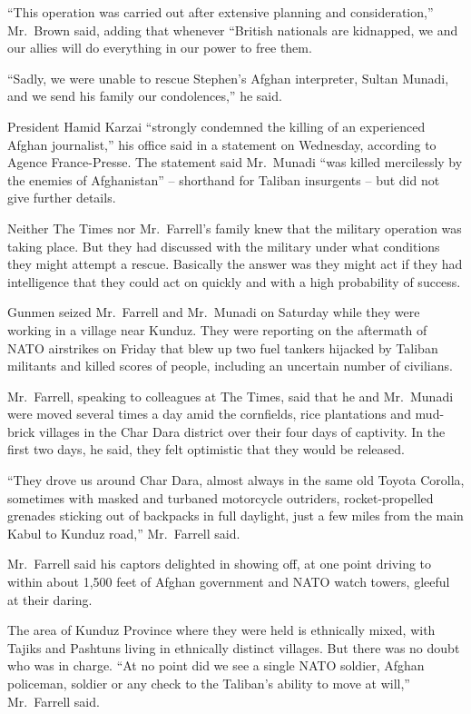 ﻿\documentclass[12pt]{article}
\begin{document}
``This operation was carried out after extensive planning and consideration,'' Mr.~Brown said,
adding that whenever ``British nationals are kidnapped, we and our allies will do everything in our
power to free them.

``Sadly, we were unable to rescue Stephen's Afghan interpreter, Sultan Munadi, and we send his
family our condolences,'' he said.

President Hamid Karzai ``strongly condemned the killing of an experienced Afghan journalist,'' his
office said in a statement on Wednesday, according to Agence France-Presse. The statement said
Mr.~Munadi ``was killed mercilessly by the enemies of Afghanistan'' -- shorthand for Taliban
insurgents -- but did not give further details.

Neither The Times nor Mr.~Farrell's family knew that the military operation was taking place. But
they had discussed with the military under what conditions they might attempt a rescue. Basically
the answer was they might act if they had intelligence that they could act on quickly and with a
high probability of success.

Gunmen seized Mr.~Farrell and Mr.~Munadi on Saturday while they were working in a village near
Kunduz. They were reporting on the aftermath of NATO airstrikes on Friday that blew up two fuel
tankers hijacked by Taliban militants and killed scores of people, including an uncertain number of
civilians.

Mr.~Farrell, speaking to colleagues at The Times, said that he and Mr.~Munadi were moved several
times a day amid the cornfields, rice plantations and mud-brick villages in the Char Dara district
over their four days of captivity. In the first two days, he said, they felt optimistic that they
would be released.

``They drove us around Char Dara, almost always in the same old Toyota Corolla, sometimes with
masked and turbaned motorcycle outriders, rocket-propelled grenades sticking out of backpacks in
full daylight, just a few miles from the main Kabul to Kunduz road,'' Mr.~Farrell said.

Mr.~Farrell said his captors delighted in showing off, at one point driving to within about 1,500
feet of Afghan government and NATO watch towers, gleeful at their daring.

The area of Kunduz Province where they were held is ethnically mixed, with Tajiks and Pashtuns
living in ethnically distinct villages. But there was no doubt who was in charge. ``At no point did
we see a single NATO soldier, Afghan policeman, soldier or any check to the Taliban's ability to
move at will,'' Mr.~Farrell said.
\end{document}
